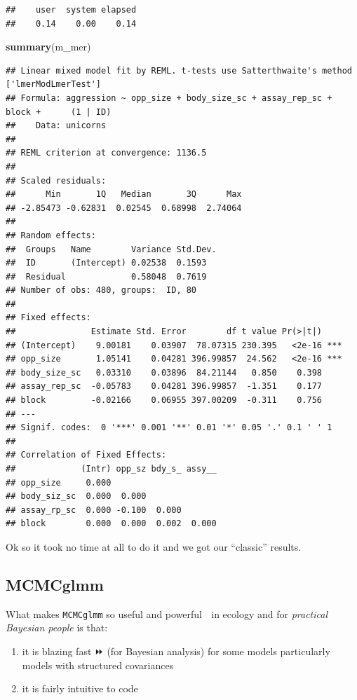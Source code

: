 \documentclass[
  12pt,
]{book}
\newenvironment{Shaded}{\begin{snugshade}}{\end{snugshade}}
\newcommand{\KeywordTok}[1]{\textcolor[rgb]{0.13,0.29,0.53}{\textbf{#1}}}
\newcommand{\NormalTok}[1]{#1}
\providecommand{\tightlist}{%
  \setlength{\itemsep}{0pt}\setlength{\parskip}{0pt}}
\begin{document}
\begin{verbatim}
##    user  system elapsed 
##    0.14    0.00    0.14
\end{verbatim}

\begin{Shaded}
\begin{Highlighting}[]
\KeywordTok{summary}\NormalTok{(m\_mer)}
\end{Highlighting}
\end{Shaded}

\begin{verbatim}
## Linear mixed model fit by REML. t-tests use Satterthwaite's method ['lmerModLmerTest']
## Formula: aggression ~ opp_size + body_size_sc + assay_rep_sc + block +      (1 | ID)
##    Data: unicorns
## 
## REML criterion at convergence: 1136.5
## 
## Scaled residuals: 
##      Min       1Q   Median       3Q      Max 
## -2.85473 -0.62831  0.02545  0.68998  2.74064 
## 
## Random effects:
##  Groups   Name        Variance Std.Dev.
##  ID       (Intercept) 0.02538  0.1593  
##  Residual             0.58048  0.7619  
## Number of obs: 480, groups:  ID, 80
## 
## Fixed effects:
##               Estimate Std. Error        df t value Pr(>|t|)    
## (Intercept)    9.00181    0.03907  78.07315 230.395   <2e-16 ***
## opp_size       1.05141    0.04281 396.99857  24.562   <2e-16 ***
## body_size_sc   0.03310    0.03896  84.21144   0.850    0.398    
## assay_rep_sc  -0.05783    0.04281 396.99857  -1.351    0.177    
## block         -0.02166    0.06955 397.00209  -0.311    0.756    
## ---
## Signif. codes:  0 '***' 0.001 '**' 0.01 '*' 0.05 '.' 0.1 ' ' 1
## 
## Correlation of Fixed Effects:
##             (Intr) opp_sz bdy_s_ assy__
## opp_size     0.000                     
## body_siz_sc  0.000  0.000              
## assay_rp_sc  0.000 -0.100  0.000       
## block        0.000  0.000  0.002  0.000
\end{verbatim}

Ok so it took no time at all to do it and we got our ``classic'' results.

\hypertarget{mcmcglmm}{%
\subsection{MCMCglmm}\label{mcmcglmm}}

What makes \texttt{MCMCglmm} so useful and powerful 💪 in ecology and for \emph{practical Bayesian people} is that:

\begin{enumerate}
\def\labelenumi{\arabic{enumi}.}
\tightlist
\item
  it is blazing fast ⏩ (for Bayesian analysis) for some models particularly models with structured covariances
\item
  it is fairly intuitive to code
\end{enumerate}
\end{document}
